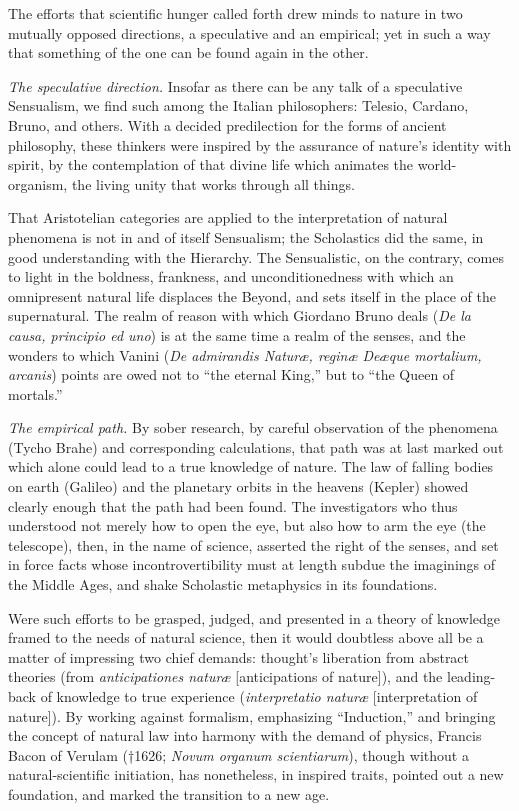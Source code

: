 \documentclass[12pt]{book}
\begin{document}
The efforts that scientific hunger called forth drew minds to nature in two
mutually opposed directions, a speculative and an empirical; yet in such a way
that something of the one can be found again in the other.

\emph{The speculative direction.} Insofar as there can be any talk of a
speculative Sensualism, we find such among the Italian philosophers: Telesio,
Cardano, Bruno, and others. With a decided predilection for the forms of ancient
philosophy, these thinkers were inspired by the assurance of nature's identity
with spirit, by the contemplation of that divine life which animates the
world-organism, the living unity that works through all things.

That Aristotelian categories are applied to the interpretation of natural
phenomena is not in and of itself Sensualism; the Scholastics did the same, in
good understanding with the Hierarchy. The Sensualistic, on the contrary, comes
to light in the boldness, frankness, and unconditionedness with which an
omnipresent natural life displaces the Beyond, and sets itself in the place of
the supernatural. The realm of reason with which Giordano Bruno deals
(\textit{De la causa, principio ed uno})
is at the same time a realm of the senses, and the wonders to which Vanini
(\textit{De admirandis Naturæ, reginæ Deæque mortalium, arcanis}) points are owed
not to ``the eternal King,'' but to ``the Queen of mortals.''

\emph{The empirical path.} By sober research, by careful observation of the
phenomena (Tycho Brahe) and corresponding calculations, that path was at last
marked out which alone could lead to a true knowledge of nature. The law of
falling bodies on earth (Galileo) and the planetary orbits in the heavens
(Kepler) showed clearly enough that the path had been found. The investigators
who thus understood not merely how to open the eye, but also how to arm the eye
(the telescope), then, in the name of science, asserted the right of the senses,
and set in force facts whose incontrovertibility must at length subdue the
imaginings of the Middle Ages, and shake Scholastic metaphysics in its
foundations.

Were such efforts to be grasped, judged, and presented in a theory of knowledge
framed to the needs of natural science, then it would doubtless above all be a
matter of impressing two chief demands: thought's liberation from abstract
theories (from \textit{anticipationes naturæ} [anticipations of nature]), and the
leading-back of knowledge to true experience (\textit{interpretatio naturæ}
[interpretation of nature]). By working against formalism, emphasizing
``Induction,'' and bringing the concept of natural law into harmony with the
demand of physics, Francis Bacon of Verulam (†1626; \textit{Novum organum
scientiarum}), though without a natural-scientific initiation, has nonetheless,
in inspired traits, pointed out a new foundation, and marked the transition to a
new age.
\end{document}
